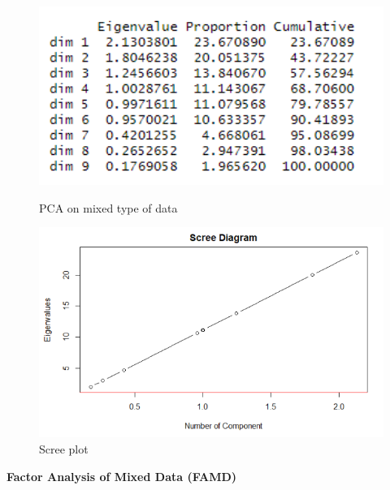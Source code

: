 \documentclass{FR16}
\begin{document}
\begin{figure}[!htb]
   \begin{minipage}{0.48\textwidth}
     \centering
    \includegraphics[width=1\textwidth]{figures/pcamix.PNG} 
 \caption{\label{fig:29} PCA on mixed type of data}
   \end{minipage}\hfill
   \begin{minipage}{0.48\textwidth}
     \centering
       \includegraphics[width=1\textwidth]{figures/pcamix2.PNG} 
 \caption{\label{fig:30} Scree plot }
   \end{minipage}
   
\end{figure}

\noindent \textbf{Factor Analysis of Mixed Data (FAMD)}
\end{document}
